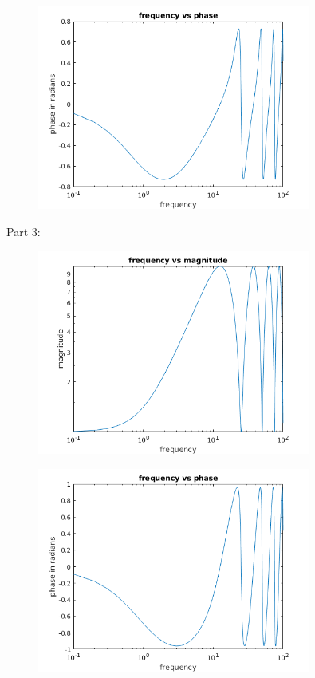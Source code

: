 \documentclass{article}
\begin{document}
\begin{figure}[H]
    \centering
    \includegraphics[width=0.8\textwidth]{PR3_2phase.png}
\end{figure}
Part 3:
\begin{figure}[H]
    \centering
    \includegraphics[width=0.8\textwidth]{PR3_3amp.png}
\end{figure}
\begin{figure}[H]
    \centering
    \includegraphics[width=0.8\textwidth]{PR3_3phase.png}
\end{figure}
\end{document}
